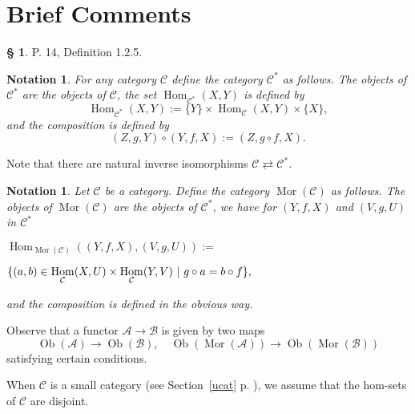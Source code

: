 \documentclass[12pt]{article}
\newtheorem{nota}[thm]{Notation}
\theoremstyle{remark}
\theoremstyle{definition}
\newtheorem{s}[thm]{\S}
\newcommand{\A}{\mathcal A}
\newcommand{\B}{\mathcal B}
\newcommand{\C}{\mathcal C}
\newcommand{\U}{\mathcal U}
\DeclareMathOperator{\Hom}{Hom}%
\DeclareMathOperator{\Mor}{Mor}
\DeclareMathOperator{\Ob}{Ob}
\begin{document}
\section{Brief Comments}\label{bc} %
%
\begin{s}\label{d125} 
P. 14, Definition 1.2.5.
%
\begin{nota}\label{c*}
%
For any category $\C$ define the category $\C^*$ as follows. The objects of $\C^*$ are the objects of $\C$, the set $\Hom_{\C^*}(X,Y)$ is defined by 
$$
\Hom_{\C^*}(X,Y):=\{Y\}\times\Hom_{\C}(X,Y)\times\{X\},
$$
and the composition is defined by 
$$
(Z,g,Y)\circ(Y,f,X):=(Z,g\circ f,X).
$$ 
%
\end{nota}
%
Note that there are natural inverse isomorphisms $\C\rightleftarrows\C^*$. 
%
\begin{nota}\label{mor}
%
Let $\C$ be a category. Define the category $\Mor(\C)$ as follows. The objects of $\Mor(\C)$ are the objects of $\C^*$, we have for $(Y,f,X)$ and $(V,g,U)$ in $\C^*$\bigskip 

\noindent$\displaystyle \Hom_{\Mor(\C)}((Y,f,X),(V,g,U)):=$\bigskip 

$\hfill\displaystyle\{(a,b)\in\Hom_\C(X,U)\times\Hom_\C(Y,V)\ | \ g\circ a=b\circ f\},$\bigskip 

\noindent and the composition is defined in the obvious way.
%
\end{nota}
%
Observe that a functor $\A\to\B$ is given by two maps 
$$
\Ob(\A)\to\Ob(\B),\quad\Ob(\Mor(\A))\to\Ob(\Mor(\B))
$$ 
satisfying certain conditions.

When $\C$ is a small category (see Section~\ref{ucat} p. \pageref{ucat}), we assume that the hom-sets of $\C$ are disjoint.
\end{s}
%
%
\end{document}
